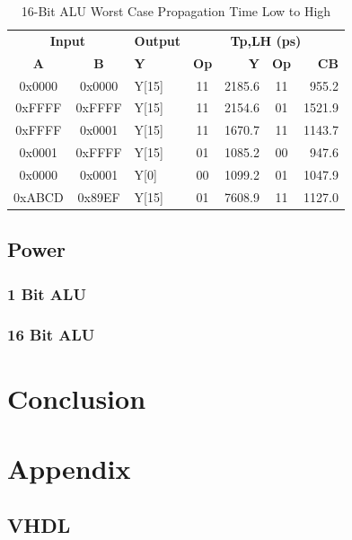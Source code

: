 \documentclass[11pt]{article}
\begin{document}
		
			\begin{table}[H]
				\centering
				\caption{16-Bit ALU Worst Case Propagation Time Low to High}
				\label{tab:ALU-16-Bit-Tpd-LH}
				\begin{tabular}{|cclcrcr|}
					\hline
					\multicolumn{2}{|c}{\textbf{Input}} & \textbf{Output} & \multicolumn{4}{c|}{\textbf{Tp,LH (ps)}} \\
					\textbf{A} & \textbf{B} & \textbf{Y} & \textbf{Op} & \textbf{Y} & \textbf{Op} & \textbf{CB} \\
					\hline
					0x0000 & 0x0000 & Y{[}15{]} & 11 & 2185.6 & 11 & 955.2 \\
					0xFFFF & 0xFFFF & Y{[}15{]} & 11 & 2154.6 & 01 & 1521.9 \\
					0xFFFF & 0x0001 & Y{[}15{]} & 11 & 1670.7 & 11 & 1143.7 \\
					0x0001 & 0xFFFF & Y{[}15{]} & 01 & 1085.2 & 00 & 947.6 \\
					0x0000 & 0x0001 & Y{[}0{]} & 00 & 1099.2 & 01 & 1047.9 \\
					0xABCD & 0x89EF & Y{[}15{]} & 01 & 7608.9 & 11 & 1127.0 \\
					\hline
				\end{tabular}
			\end{table}
		
			
	
	\subsection{Power}
		
		\subsubsection{1 Bit ALU}
		
		\subsubsection{16 Bit ALU}

\section{Conclusion}


\section{Appendix}

	\subsection{VHDL}
	
\end{document}
